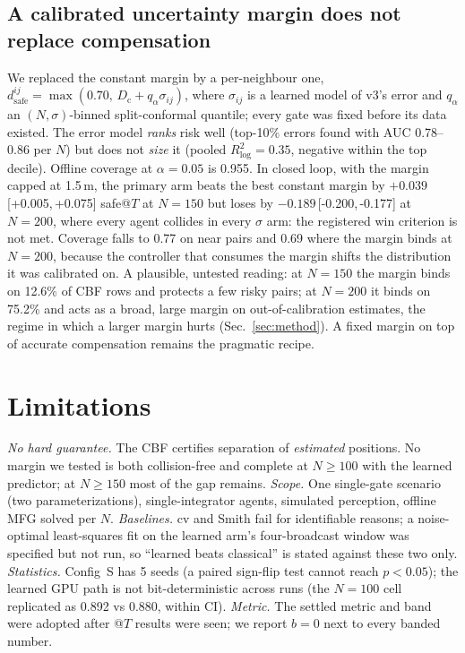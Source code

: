 \documentclass[letterpaper,10pt,journal,twoside]{IEEEtran}
\newcommand{\dsafe}{d_{\mathrm{safe}}}
\newcommand{\ci}[2]{\,[#1,\,#2]}
\begin{document}
\subsection{A calibrated uncertainty margin does not replace compensation}
\label{sec:sigma}
We replaced the constant margin by a per-neighbour one, $\dsafe^{ij}=\max(0.70,\,D_{\mathrm{c}}+q_\alpha\sigma_{ij})$,
where $\sigma_{ij}$ is a learned model of v3's error and $q_\alpha$ an $(N,\sigma)$-binned split-conformal quantile;
every gate was fixed before its data existed. The error model \emph{ranks} risk well (top-10\% errors found with
AUC 0.78--0.86 per $N$) but does not \emph{size} it (pooled $R^2_{\log}{=}0.35$, negative within the top decile).
Offline coverage at $\alpha{=}0.05$ is 0.955. In closed loop, with the margin capped at 1.5\,m, the primary arm
beats the best constant margin by $+0.039$\ci{+0.005}{+0.075} safe@$T$ at $N{=}150$ but loses by
$-0.189$\ci{-0.200}{-0.177} at $N{=}200$, where every agent collides in every $\sigma$ arm: the registered win
criterion is not met. Coverage falls to 0.77 on near pairs and 0.69 where the margin binds at $N{=}200$, because the
controller that consumes the margin shifts the distribution it was calibrated on. A plausible, untested reading:
at $N{=}150$ the margin binds on 12.6\% of CBF rows and protects a few risky pairs; at $N{=}200$ it binds on 75.2\%
and acts as a broad, large margin on out-of-calibration estimates, the regime in which a larger margin hurts
(Sec.~\ref{sec:method}). A fixed margin on top of accurate compensation remains the pragmatic recipe.

\section{Limitations}
\label{sec:limits}
\emph{No hard guarantee.} The CBF certifies separation of \emph{estimated} positions. No margin we tested is both
collision-free and complete at $N\ge100$ with the learned predictor; at $N\ge150$ most of the gap remains.
\emph{Scope.} One single-gate scenario (two parameterizations), single-integrator agents, simulated perception,
offline MFG solved per $N$. \emph{Baselines.} cv and Smith fail for identifiable reasons; a noise-optimal
least-squares fit on the learned arm's four-broadcast window was specified but not run, so ``learned beats
classical'' is stated against these two only. \emph{Statistics.} Config~S has 5 seeds (a paired sign-flip test
cannot reach $p<0.05$); the learned GPU path is not bit-deterministic across runs (the $N{=}100$ cell replicated
as 0.892 vs 0.880, within CI). \emph{Metric.} The settled metric and band were adopted after @$T$ results were seen;
we report $b{=}0$ next to every banded number.
\end{document}
